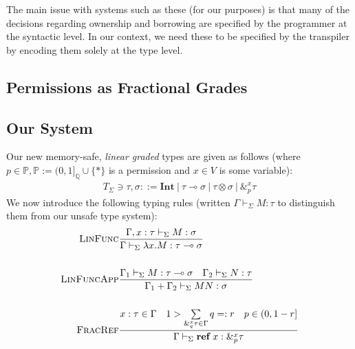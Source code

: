 \documentclass{article}
\renewcommand\em{\bfseries}
\newcommand{\mkref}{\textbf{ref}~}
\newcommand{\lolly}{\multimap}
\newcommand{\judge}[3]{\textsc{#1}&\frac{#2}{#3}}
\begin{document}

The main issue with systems such as these (for our purposes) is that many of the decisions regarding ownership and borrowing are specified by the programmer at the syntactic level. In our context, we need these to be specified by the transpiler by encoding them solely at the type level. 



\subsection{Permissions as Fractional Grades}

\subsection{Our System}

Our new memory-safe, \textit{linear graded} types are given as follows (where $p \in \mathbb{P}, \mathbb{P} := (0, 1]_{\mathbb{Q}} \cup \{*\}$ is a permission and $x \in V$ is some variable):
\begin{align*}
    T_\Sigma \ni \tau, \sigma ::=  \textbf{Int} ~|~ \tau \lolly \sigma ~|~ \tau \otimes \sigma ~|~ \&_p^x \tau 
\end{align*}
We now introduce the following typing rules (written $\Gamma \vdash_\Sigma M : \tau$ to distinguish them from our unsafe type system):
\begin{align*}
    \judge{LinFunc}{\Gamma, x : \tau \vdash_\Sigma M : \sigma}{ \Gamma \vdash_\Sigma \lambda x . M : \tau \lolly \sigma}\\
    ~\\
    \judge{LinFuncApp}{\Gamma_1 \vdash_\Sigma M : \tau \lolly \sigma \hspace{1em} \Gamma_2 \vdash_\Sigma N : \tau}{\Gamma_1 + \Gamma_2 \vdash_\Sigma M N : \sigma}\\
    ~\\
    \judge{FracRef}{x : \tau \in \Gamma \hspace{1em} 1 > \sum\limits_{\&_q^x \tau \in \Gamma} q =: r \hspace{1em} p \in (0, 1-r]}{\Gamma \vdash_\Sigma \mkref x : \&^x_p \tau}\\
    ~\\
    \judge{}{}{}
\end{align*}



\renewcommand\em{\it}
\printbibliography[title={References}]
\end{document}
